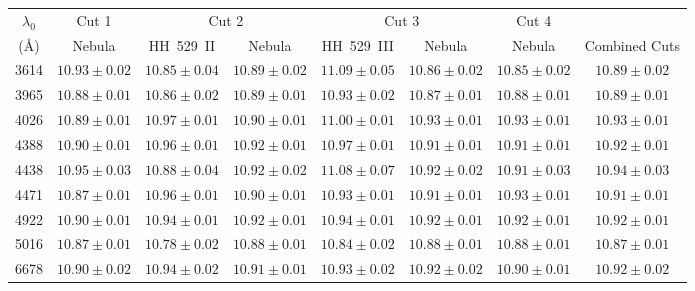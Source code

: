 \documentclass[fleqn,usenatbib]{mnras}
\begin{document}
\begin{table*}
\centering
\caption{He$^+$/H$^+$ abundances determined with He\thinspace I singlet lines and triplet lines less affected by  self-absorption effects.}
\label{tab:helium_1}
\begin{tabular}{cccccccc}
\hline 
$\lambda_0$ & \multicolumn{1}{c}{Cut 1} & \multicolumn{2}{c}{Cut 2} & \multicolumn{2}{c}{Cut 3} & \multicolumn{1}{c}{Cut 4} & \\
(\AA) &  Nebula & HH~529~II & Nebula & HH~529~III & Nebula & Nebula & Combined Cuts  \\
\hline 

3614 & $10.93 \pm 0.02$ & $10.85 \pm 0.04$ & $10.89 \pm 0.02$ &  $11.09 \pm 0.05$  & $10.86 \pm 0.02$ & $10.85 \pm 0.02$ & $10.89 \pm 0.02$  \\

3965 & $10.88 \pm 0.01$ & $10.86 \pm 0.02$ & $10.89 \pm 0.01$ &  $10.93 \pm 0.02$ & $10.87 \pm 0.01$ & $10.88 \pm 0.01$ & $10.89 \pm 0.01$  \\

4026 & $10.89 \pm 0.01$ & $10.97 \pm 0.01$ & $10.90 \pm 0.01$ &  $11.00 \pm 0.01$  & $10.93\pm 0.01$ & $10.93 \pm 0.01$ & $10.93 \pm 0.01$  \\

4388 & $10.90 \pm 0.01$ & $10.96 \pm 0.01$ & $10.92 \pm 0.01$ &  $10.97 \pm 0.01$ & $10.91\pm 0.01$  & $10.91 \pm 0.01$ & $10.92 \pm 0.01$  \\

4438 &  $10.95\pm 0.03$ & $10.88 \pm 0.04$ & $10.92 \pm 0.02$ &  $11.08 \pm 0.07$  & $10.92 \pm 0.02$ & $10.91 \pm 0.03$ & $10.94 \pm 0.03$  \\

4471 &  $10.87 \pm 0.01$ & $10.96 \pm 0.01$ & $10.90 \pm 0.01$ &  $10.93 \pm 0.01$ & $10.91 \pm 0.01$ & $10.93 \pm 0.01$ & $10.91 \pm 0.01$  \\

4922 & $10.90 \pm 0.01$ & $10.94 \pm 0.01$ & $10.92 \pm 0.01$ & $10.94 \pm 0.01$ & $10.92 \pm 0.01$ & $10.92 \pm 0.01$ & $10.92 \pm 0.01$  \\

5016 & $10.87 \pm 0.01$ & $10.78 \pm 0.02$ & $10.88 \pm 0.01$ & $10.84 \pm 0.02$ & $10.88 \pm 0.01$ & $10.88 \pm 0.01$ & $10.87 \pm 0.01$  \\


6678 & $10.90 \pm 0.02$ & $10.94 \pm 0.02$ & $10.91 \pm 0.01$ & $10.93 \pm 0.02$  & $10.92 \pm 0.02$ & $10.90\pm 0.01$ & $10.92 \pm 0.02$   \\


\end{tabular}
\end{table*}
\end{document}
